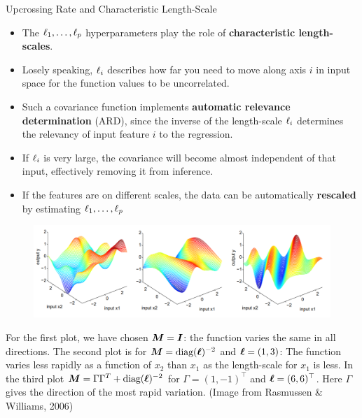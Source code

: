\begin{frame}[c,allowframebreaks]{Upcrossing Rate and Characteristic Length-Scale}
\begin{itemize} 
\item The $\ell_1,\dots, \ell_p$ hyperparameters play the role of \textbf{characteristic length-scales}.
\vspace{2mm}
\item Losely speaking, $\ell_i$ describes how far you need to move along axis $i$ in input space for the function values to be uncorrelated.
\vspace{2mm}
\item Such a covariance function implements \textbf{automatic relevance determination} (ARD), since the inverse of the length-scale $\ell_i$ determines the relevancy of input feature $i$ to the regression.
\vspace{2mm}
\item If $\ell_i$ is very large, the covariance will become almost independent of that input, effectively removing it from inference.
\vspace{2mm}
\item If the features are on different scales, the data can be automatically \textbf{rescaled} by estimating $\ell_1,\dots, \ell_p$ 

\end{itemize}



\framebreak


\begin{figure}
	\includegraphics[width = .8\textwidth]{figure_man/covariance2D.png}
\end{figure}

\vspace{3mm}
For the first plot, we have chosen $\bm{M} = \boldsymbol{I}$: the function varies the same in all directions. The second plot is for $\bm{M} = \text{diag}(\bm{\ell})^{-2}$ and $\bm{\ell} = \left(1, 3 \right)$: The function varies less rapidly as a function of $x_2$ than $x_1$ as the length-scale for $x_1$ is less. In the third plot $\bm{M} = \Gamma \Gamma^T + \text{diag}(\bm{\ell})^{-2}$ for $\Gamma = (1, -1)^\top$ and $\bm{\ell} = (6, 6)^\top$. Here $\Gamma$ gives the direction of the most rapid variation. (Image from Rasmussen \& Williams, 2006)


\end{frame}


